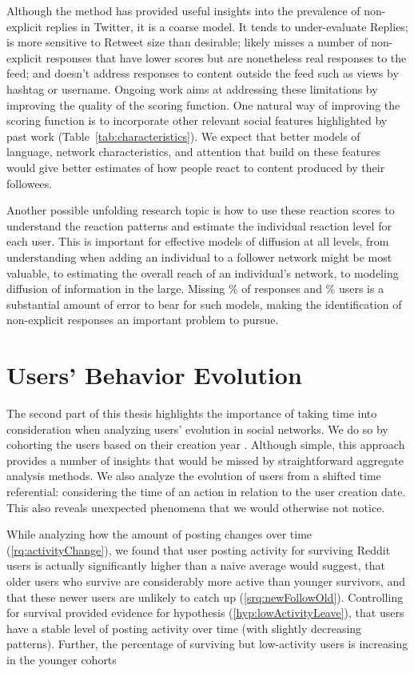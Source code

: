 Although the method has provided useful insights into the prevalence of non-explicit replies in Twitter, it is a coarse model.  It tends to under-evaluate Replies; is more sensitive to Retweet size than desirable; likely misses a number of non-explicit responses that have lower scores but are nonetheless real responses to the feed; and doesn't address responses to content outside the feed such as views by hashtag or username.  Ongoing work aims at addressing these limitations by improving the quality of the scoring function.  One natural way of improving the scoring function is to incorporate other relevant social features highlighted by past work (Table~\ref{tab:characteristics}).  We expect that better models of language, network characteristics, and attention that build on these features would give better estimates of how people react to content produced by their followees.

Another possible unfolding research topic is how to use these reaction scores to understand the reaction patterns and estimate the individual reaction level for each user.  This is important for effective models of diffusion at all levels, from understanding when adding an individual to a follower network might be most valuable, to estimating the overall reach of an individual's network, to modeling diffusion of information in the large.  Missing \highNonTaggedTweetCountPct{}\% of responses and \usersAboveLinePct{}\% users is a substantial amount of error to bear for such models, making the identification of non-explicit responses an important problem to pursue.


\section{Users' Behavior Evolution}
\color{red}
The second part of this thesis highlights the importance of taking time into consideration when analyzing users' evolution in social networks. We do so by cohorting the users based on their creation year \cite{Barbosa2016}. Although simple, this approach provides a number of insights that would be missed by straightforward aggregate analysis methods.  We also analyze the evolution of users from a shifted time referential: considering the time of an action in relation to the user creation date. This also reveals unexpected phenomena that we would otherwise not notice.
\color{black}

While analyzing how the amount of posting changes over time (\ref{rq:activityChange}), we found that user posting activity for surviving Reddit users is actually significantly higher than a naive average would suggest, that older users who survive are considerably more active than younger survivors, and that these newer users are unlikely to catch up (\ref{srq:newFollowOld}).  Controlling for survival provided evidence for hypothesis (\ref{hyp:lowActivityLeave}), that users have a stable level of posting activity over time (with slightly decreasing patterns).  Further, the percentage of surviving but low-activity users is increasing in the younger cohorts 

